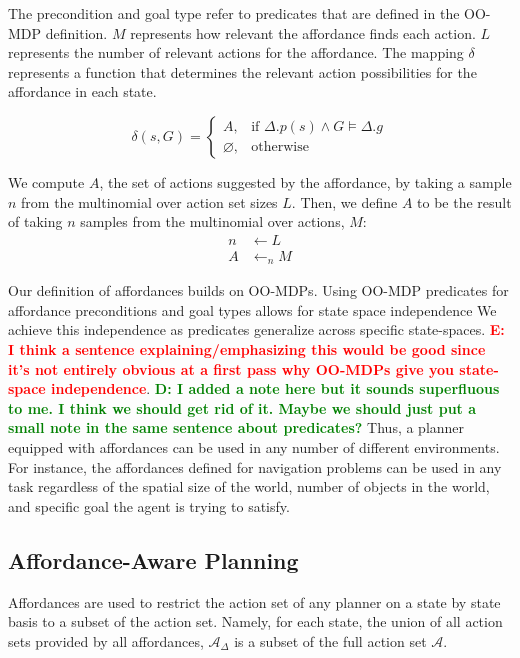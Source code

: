 \documentclass[conference]{IEEEtran}
\newcommand{\dnote}[1]{\textcolor{Green}{\textbf{D: #1}}}
\newcommand{\enote}[1]{\textcolor{Red}{\textbf{E: #1}}}
\begin{document}
The precondition and goal type refer to predicates that are defined in the OO-MDP definition.
$M$ represents how relevant the affordance finds each action. $L$ represents
the number of relevant actions for the affordance. The mapping $\delta$
represents a function that determines the relevant action possibilities for the affordance in each state.

\begin{equation}
\delta(s,G)= 
\begin{cases}
    A, & \text{if } \Delta.p(s) \wedge G \models \Delta.g \\
    \varnothing,              & \text{otherwise}
\end{cases}
\label{eq:delta_mapping}
\end{equation}

We compute $A$, the set of actions suggested by the affordance, by taking a sample $n$ from the multinomial over action set sizes $L$. Then,
we define $A$ to be the result of taking $n$ samples from the multinomial over actions, $M$:
\begin{align}
n &\leftarrow L \\
A &\leftarrow_n M
\end{align}

Our definition of affordances builds on OO-MDPs. Using OO-MDP predicates for affordance
preconditions and goal types allows for state space independence We achieve this
independence as predicates generalize across specific state-spaces. 
\enote{I think a sentence explaining/emphasizing this would be good since it's not entirely obvious at a first pass why OO-MDPs give you state-space independence}. \dnote{I added a note here but it sounds superfluous to me. I think we should get rid of it. Maybe we should just put a small note in the same sentence about predicates?} 
Thus, a planner equipped with affordances can be used in any number of
different environments. For instance, the affordances defined for 
navigation problems can be used in any task regardless of the spatial size of the world, 
number of objects in the world, and specific goal the agent is trying to satisfy.

\subsection{Affordance-Aware Planning}
Affordances are used to restrict the action set of any planner on a state by state basis to a subset of the action set. Namely, for each state, the union of all action sets provided by all affordances, $\mathcal{A}_{\Delta}$ is a subset of the full action set $\mathcal{A}$.
\end{document}
